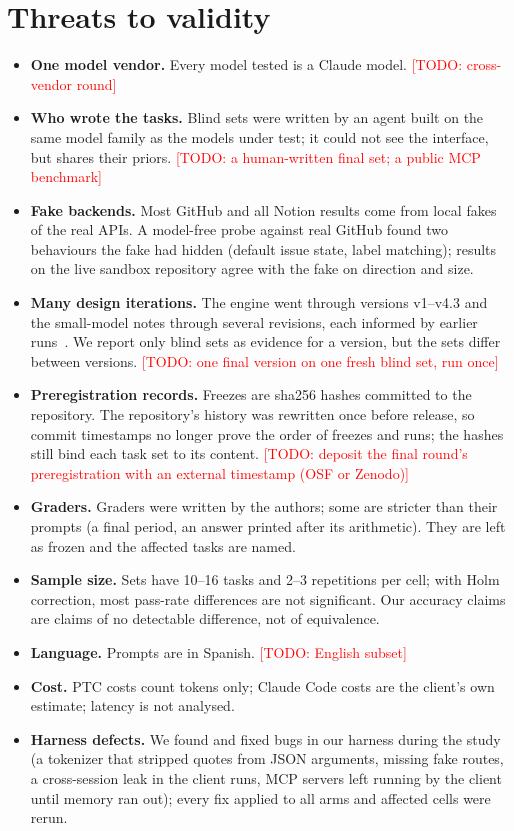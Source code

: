 \documentclass[11pt]{article}
\newcommand{\todo}[1]{\textcolor{red}{[TODO: #1]}}
\begin{document}
\section{Threats to validity}
\label{sec:threats}
\begin{itemize}
  \item \textbf{One model vendor.} Every model tested is a Claude model. \todo{cross-vendor round}
  \item \textbf{Who wrote the tasks.} Blind sets were written by an agent built on the same model family as the models under test; it could not see the interface, but shares their priors. \todo{a human-written final set; a public MCP benchmark}
  \item \textbf{Fake backends.} Most GitHub and all Notion results come from local fakes of the real APIs. A model-free probe against real GitHub found two behaviours the fake had hidden (default issue state, label matching); results on the live sandbox repository agree with the fake on direction and size.
  \item \textbf{Many design iterations.} The engine went through versions v1--v4.3 and the small-model notes through several revisions, each informed by earlier runs~\cite{gelman2013forking}. We report only blind sets as evidence for a version, but the sets differ between versions. \todo{one final version on one fresh blind set, run once}
  \item \textbf{Preregistration records.} Freezes are sha256 hashes committed to the repository. The repository's history was rewritten once before release, so commit timestamps no longer prove the order of freezes and runs; the hashes still bind each task set to its content. \todo{deposit the final round's preregistration with an external timestamp (OSF or Zenodo)}
  \item \textbf{Graders.} Graders were written by the authors; some are stricter than their prompts (a final period, an answer printed after its arithmetic). They are left as frozen and the affected tasks are named.
  \item \textbf{Sample size.} Sets have 10--16 tasks and 2--3 repetitions per cell; with Holm correction, most pass-rate differences are not significant. Our accuracy claims are claims of no detectable difference, not of equivalence.
  \item \textbf{Language.} Prompts are in Spanish. \todo{English subset}
  \item \textbf{Cost.} PTC costs count tokens only; Claude Code costs are the client's own estimate; latency is not analysed.
  \item \textbf{Harness defects.} We found and fixed bugs in our harness during the study (a tokenizer that stripped quotes from JSON arguments, missing fake routes, a cross-session leak in the client runs, MCP servers left running by the client until memory ran out); every fix applied to all arms and affected cells were rerun.
\end{itemize}
\end{document}
